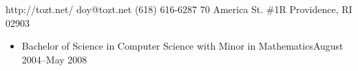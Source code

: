 \documentclass[letterpaper]{article}
\begin{document}
          {http://tozt.net/}
          {doy@tozt.net\hspace{0.5in}}
          {(618) 616-6287}
          {70 America St. \#1R}
          {Providence, RI 02903}
\begin{itemize}
    \item {}
                        {Bachelor of Science in Computer Science with Minor in Mathematics}{August 2004--May 2008}
        \begin{minipage}[t]{\textwidth/2-0.2in}
            \begin{itemize}
                \vspace{-7pt}
                \vspace{4pt}
            \end{itemize}
        \end{minipage}
        \begin{minipage}[t]{\textwidth/2-0.2in}
            \begin{itemize}
                \vspace{-7pt}
                \vspace{4pt}
            \end{itemize}
        \end{minipage}
\end{itemize}
\end{document}
